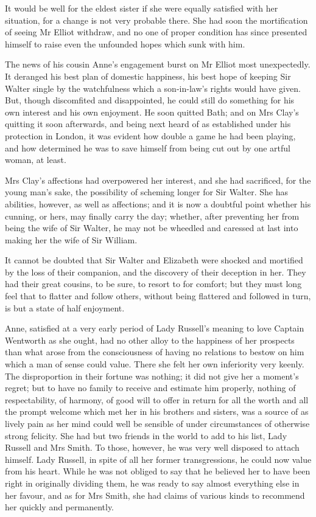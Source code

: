 It would be well for the eldest sister if she were equally satisfied with her situation, for a change is not very probable there. She had soon the mortification of seeing Mr Elliot withdraw, and no one of proper condition has since presented himself to raise even the unfounded hopes which sunk with him.

The news of his cousin Anne's engagement burst on Mr Elliot most unexpectedly. It deranged his best plan of domestic happiness, his best hope of keeping Sir Walter single by the watchfulness which a son-in-law's rights would have given. But, though discomfited and disappointed, he could still do something for his own interest and his own enjoyment. He soon quitted Bath; and on Mrs Clay's quitting it soon afterwards, and being next heard of as established under his protection in London, it was evident how double a game he had been playing, and how determined he was to save himself from being cut out by one artful woman, at least.

Mrs Clay's affections had overpowered her interest, and she had sacrificed, for the young man's sake, the possibility of scheming longer for Sir Walter. She has abilities, however, as well as affections; and it is now a doubtful point whether his cunning, or hers, may finally carry the day; whether, after preventing her from being the wife of Sir Walter, he may not be wheedled and caressed at last into making her the wife of Sir William.

It cannot be doubted that Sir Walter and Elizabeth were shocked and mortified by the loss of their companion, and the discovery of their deception in her. They had their great cousins, to be sure, to resort to for comfort; but they must long feel that to flatter and follow others, without being flattered and followed in turn, is but a state of half enjoyment.

Anne, satisfied at a very early period of Lady Russell's meaning to love Captain Wentworth as she ought, had no other alloy to the happiness of her prospects than what arose from the consciousness of having no relations to bestow on him which a man of sense could value. There she felt her own inferiority very keenly. The disproportion in their fortune was nothing; it did not give her a moment's regret; but to have no family to receive and estimate him properly, nothing of respectability, of harmony, of good will to offer in return for all the worth and all the prompt welcome which met her in his brothers and sisters, was a source of as lively pain as her mind could well be sensible of under circumstances of otherwise strong felicity. She had but two friends in the world to add to his list, Lady Russell and Mrs Smith. To those, however, he was very well disposed to attach himself. Lady Russell, in spite of all her former transgressions, he could now value from his heart. While he was not obliged to say that he believed her to have been right in originally dividing them, he was ready to say almost everything else in her favour, and as for Mrs Smith, she had claims of various kinds to recommend her quickly and permanently.

